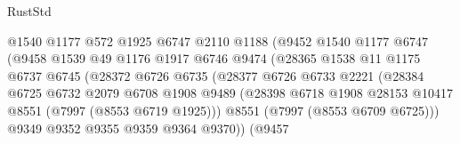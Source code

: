 \begin{lexlean}{RustStd}
\begin{coremodule}
{\begin{coremodule}
{{{{{{{{{{{{{{{{{{{{{{{{{{{{{{{{{{{{{{{{{{{                                  @1540
                                  @1177
                                  @572
                                  @1925
                                  @6747
                                  @2110
                                  @1188
                                  (@9452
                                    @1540
                                    @1177
                                    @6747
                                    (@9458
                                      @1539
                                      @49
                                      @1176
                                      @1917
                                      @6746
                                      @9474
                                      (@28365
                                        @1538
                                        @11
                                        @1175
                                        @6737
                                        @6745
                                        (@28372
                                          @6726
                                          @6735
                                          (@28377
                                            @6726
                                            @6733
                                            @2221
                                            (@28384
                                              @6725
                                              @6732
                                              @2079
                                              @6708
                                              @1908
                                              @9489
                                              (@28398
                                                @6718
                                                @1908
                                                @28153
                                                @10417
                                                @8551
                                                (@7997 (@8553 @6719 @1925)))
                                              @8551
                                              (@7997 (@8553 @6709 @6725)))
                                            @9349
                                            @9352
                                            @9355
                                            @9359
                                            @9364
                                            @9370))
                                        (@9457
}}}}}}}}}}}}}}}}}}}}}}}}}}}}}}}}}}}}}}}}}}}
\end{coremodule}}
\end{coremodule}
\end{lexlean}
